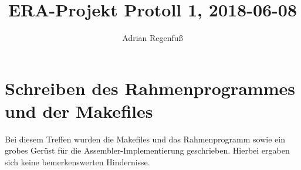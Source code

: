 \documentclass{article}
\title{ERA-Projekt Protoll 1, 2018-06-08}
\author{Adrian Regenfuß}
\begin{document}
\maketitle

\section{Schreiben des Rahmenprogrammes und der Makefiles}

Bei diesem Treffen wurden die Makefiles und das Rahmenprogramm sowie
ein grobes Gerüst für die Assembler-Implementierung geschrieben.
Hierbei ergaben sich keine bemerkenswerten Hindernisse.
\end{document}
